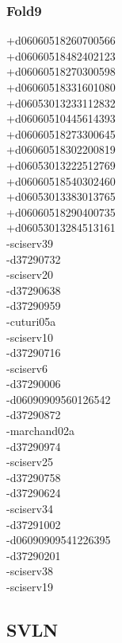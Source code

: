 \begin{multicols}{4}
\subsubsection*{Fold9}
+d06060518260700566\\
+d06060518482402123\\
+d06060518270300598\\
+d06060518331601080\\
+d06053013233112832\\
+d06060510445614393\\
+d06060518273300645\\
+d06060518302200819\\
+d06053013222512769\\
+d06060518540302460\\
+d06053013383013765\\
+d06060518290400735\\
+d06053013284513161\\
-sciserv39\\
-d37290732\\
-sciserv20\\
-d37290638\\
-d37290959\\
-cuturi05a\\
-sciserv10\\
-d37290716\\
-sciserv6\\
-d37290006\\
-d06090909560126542\\
-d37290872\\
-marchand02a\\
-d37290974\\
-sciserv25\\
-d37290758\\
-d37290624\\
-sciserv34\\
-d37291002\\
-d06090909541226395\\
-d37290201\\
-sciserv38\\
-sciserv19

\clearpage
\subsection{SVLN}
\vspace{.5cm}


\end{multicols}
